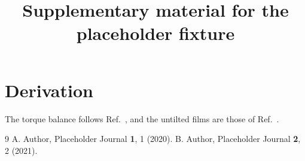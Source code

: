 \documentclass[aip,preprint]{revtex4-2}
\begin{document}
\title{Supplementary material for the placeholder fixture}
\maketitle
\section{Derivation}
The torque balance follows Ref.~\cite{A}, and the untilted films are those of Ref.~\cite{B}.
\begin{thebibliography}{9}
 A. Author, Placeholder Journal \textbf{1}, 1 (2020).
 B. Author, Placeholder Journal \textbf{2}, 2 (2021).
\end{thebibliography}
\end{document}
